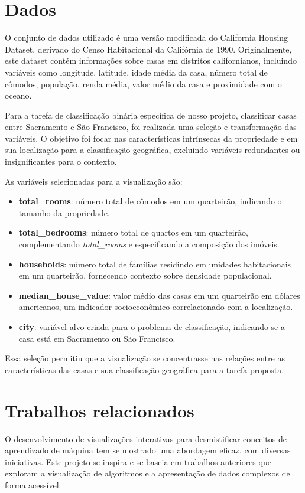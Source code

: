 \documentclass[conference]{IEEEtran}
\begin{document}
\section{Dados}
O conjunto de dados utilizado é uma versão modificada do California Housing Dataset, derivado do Censo Habitacional da Califórnia de 1990. Originalmente, este dataset contém informações sobre casas em distritos californianos, incluindo variáveis como longitude, latitude, idade média da casa, número total de cômodos, população, renda média, valor médio da casa e proximidade com o oceano.

Para a tarefa de classificação binária específica de nosso projeto, classificar casas entre Sacramento e São Francisco, foi realizada uma seleção e transformação das variáveis. O objetivo foi focar nas características intrínsecas da propriedade e em sua localização para a classificação geográfica, excluindo variáveis redundantes ou insignificantes para o contexto.

As variáveis selecionadas para a visualização são:
\begin{itemize}
    \item \textbf{total\_rooms}: número total de cômodos em um quarteirão, indicando o tamanho da propriedade.
    \item \textbf{total\_bedrooms}: número total de quartos em um quarteirão, complementando \textit{total\_rooms} e especificando a composição dos imóveis.
    \item \textbf{households}: número total de famílias residindo em unidades habitacionais em um quarteirão, fornecendo contexto sobre densidade populacional.
    \item \textbf{median\_house\_value}: valor médio das casas em um quarteirão em dólares americanos, um indicador socioeconômico correlacionado com a localização.
    \item \textbf{city}: variável-alvo criada para o problema de classificação, indicando se a casa está em Sacramento ou São Francisco.
\end{itemize}
Essa seleção permitiu que a visualização se concentrasse nas relações entre as características das casas e sua classificação geográfica para a tarefa proposta.

\section{Trabalhos relacionados}

O desenvolvimento de visualizações interativas para desmistificar conceitos de aprendizado de máquina tem se mostrado uma abordagem eficaz, com diversas iniciativas. Este projeto se inspira e se baseia em trabalhos anteriores que exploram a visualização de algoritmos e a apresentação de dados complexos de forma acessível.
\end{document}
